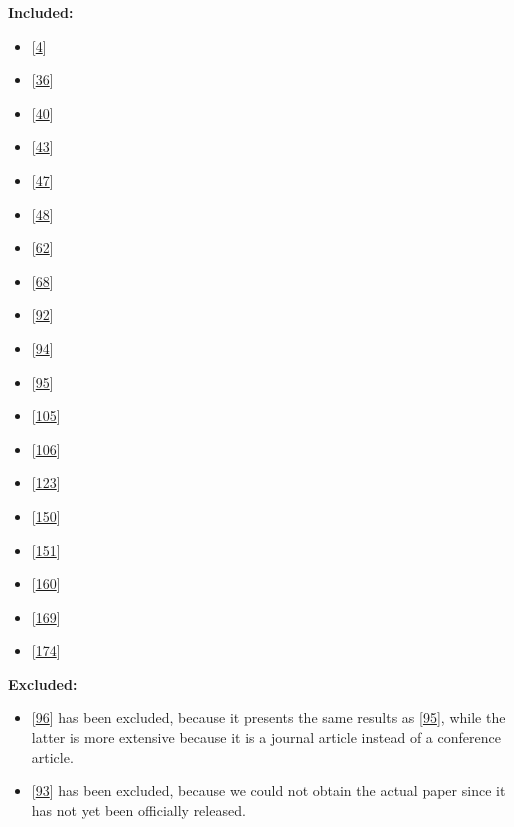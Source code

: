 \documentclass[]{book}
\providecommand{\tightlist}{%
  \setlength{\itemsep}{0pt}\setlength{\parskip}{0pt}}
\begin{document}
\textbf{Included:}

\begin{itemize}
\tightlist
\item
  {[}\protect\hyperlink{ref-adams2016a}{4}{]}
\item
  {[}\protect\hyperlink{ref-castelluccio2017a}{36}{]}
\item
  {[}\protect\hyperlink{ref-cesar2017a}{40}{]}
\item
  {[}\protect\hyperlink{ref-claes2017a}{43}{]}
\item
  {[}\protect\hyperlink{ref-da2014a}{47}{]}
\item
  {[}\protect\hyperlink{ref-da2016a}{48}{]}
\item
  {[}\protect\hyperlink{ref-dyck2015a}{62}{]}
\item
  {[}\protect\hyperlink{ref-fujibayashi2017a}{68}{]}
\item
  {[}\protect\hyperlink{ref-karvonen2017a}{92}{]}
\item
  {[}\protect\hyperlink{ref-kerzazi2013a}{94}{]}
\item
  {[}\protect\hyperlink{ref-khomh2015a}{95}{]}
\item
  {[}\protect\hyperlink{ref-laukkanen2017a}{105}{]}
\item
  {[}\protect\hyperlink{ref-laukkanen2018a}{106}{]}
\item
  {[}\protect\hyperlink{ref-mantyla2015a}{123}{]}
\item
  {[}\protect\hyperlink{ref-plewnia2014a}{150}{]}
\item
  {[}\protect\hyperlink{ref-poo-caamano2016a}{151}{]}
\item
  {[}\protect\hyperlink{ref-rodriguez2017a}{160}{]}
\item
  {[}\protect\hyperlink{ref-souza2015a}{169}{]}
\item
  {[}\protect\hyperlink{ref-teixeira2017a}{174}{]}
\end{itemize}

\textbf{Excluded:}

\begin{itemize}
\tightlist
\item
  {[}\protect\hyperlink{ref-khomh2012a}{96}{]} has been excluded,
  because it presents the same results as
  {[}\protect\hyperlink{ref-khomh2015a}{95}{]}, while the latter is more
  extensive because it is a journal article instead of a conference
  article.
\item
  {[}\protect\hyperlink{ref-kaur2019a}{93}{]} has been excluded, because
  we could not obtain the actual paper since it has not yet been
  officially released.
\end{itemize}
\end{document}
